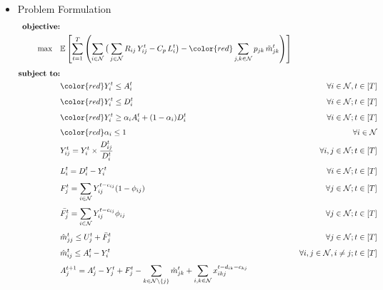 \documentclass[trsc,nonblindrev]{informs3noheader}
\begin{document}
\begin{itemize}
\item Problem Formulation 
\begin{subequations}
\begin{align}
    \textbf{objective:}\nonumber\\
    \mathbf{\max} \quad
    &\mathbb{E}\left[
    \sum_{t=1}^{T}
    \left(
    \sum_{i\in \mathcal{N}} \big( \sum_{j\in \mathcal{N}}R_{ij}\, Y_{ij}^t - C_p\, L_{i}^t \big)
    - {\color{red}\sum_{j,k\in \mathcal{N}} p_{jk}\, \tilde{m}_{jk}^t}
    \right)
    \right] \label{obj}\\[4pt]
    \textbf{subject to:}\nonumber\\
    & {\color{red} Y_i^t \leq A_{i}^t} & \forall i\in \mathcal{N}, t\in [T] \label{min(A,D)start}\\[4pt]
    & {\color{red} Y_i^t \leq D_{i}^t} & \forall i\in \mathcal{N}; t\in [T]\\[4pt]
    & {\color{red}Y_i^t \geq  \alpha_i A_{i}^t + (1-\alpha_i)  D_{i}^t} & \forall i\in \mathcal{N}; t\in [T] \label{min(A,D)}\\[4pt]
    & {\color{red} \alpha_i \leq 1} & \forall i\in \mathcal{N} \\
    & Y_{ij}^t = Y_i^t \times {\frac{D_{ij}^t}{D_i^t}}   &\forall i,j \in \mathcal{N}; t \in [T] \label{OrderFlow}\\[4pt]
    & L_{i}^t = D_i^t - Y_i^t &\forall i \in \mathcal{N}; t \in [T] \label{OrderLoss}\\[4pt]
    & F_j^t = \sum_{i \in \mathcal{N}} Y_{ij}^{t- c_{ij}}(1-\phi_{ij}) &\forall  j \in \mathcal{N};t \in [T] \label{ReturningAvailable}\\[4pt] 
    & \bar{F_{j}^t} = \sum_{i \in \mathcal{N}} Y_{ij}^{t- c_{ij}} \phi_{ij} &\forall j \in \mathcal{N};t \in [T] \label{ReturningUnavailable}\\[4pt]
    & \hat{m}_{jj}^t\leq U_j^t + \bar{F}_j^t &\forall  j \in \mathcal{N};t \in [T] \label{SwapConstraint}\\[4pt]
    & \hat{m}_{ij}^t\le A_i^t - Y_i^t &\forall  i,j \in \mathcal{N},i\neq j; t \in [T] \label{MoveConstraint}\\[4pt]
    &A_j^{t+1}
            = A_j^{t}
            - Y_j^{t} %
            + F_j^{t} %
            - \sum_{k\in \mathcal{N}\setminus \{j\} } \hat{m}_{jk}^{t} %
            + \sum_{i,k\in \mathcal{N}} x_{ikj}^{t-d_{ik}-c_{kj}} %

\end{align}
\end{subequations}
\end{itemize}
\end{document}

